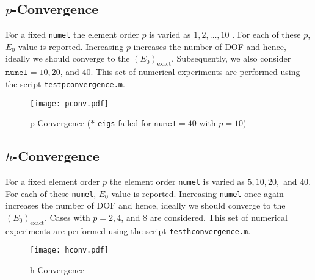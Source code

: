 \documentclass[12pt,dvipsnames]{article}
\begin{document}
\subsection{$p$-Convergence} 
For a fixed \texttt{numel} the element order $p$ is varied as $1, 2, \ldots, 10$ . For each of these $p$, $E_0$ value is 
reported. Increasing $p$ increases the number of DOF and hence, ideally we should converge to the $(E_0)_{\textrm{exact}}$. 
Subsequently, we also consider $\texttt{numel} = 10, 20$, and $40$. This set of numerical experiments are performed using 
the script \texttt{testpconvergence.m}.
%
\begin{figure}[h!]
	\centering
	\texttt{[image: pconv.pdf]}
	\caption{p-Convergence ($\ast$ \texttt{eigs} failed for $\texttt{numel} = 40$ with $p = 10$)}
\end{figure}
%
\subsection{$h$-Convergence}
For a fixed element order $p$ the element order \texttt{numel} is varied as $5, 10, 20,$ and $40$. 
For each of these \texttt{numel}, $E_0$ value is reported. Increasing \texttt{numel} once again increases the 
number of DOF and hence, ideally we should converge to the $(E_0)_{\textrm{exact}}$. 
Cases with $p = 2, 4$, and $8$ are considered. This set of numerical experiments are performed using  
the script \texttt{testhconvergence.m}.
\begin{figure}[h!]
	\centering
	\texttt{[image: hconv.pdf]}
	\caption{h-Convergence}
\end{figure}
\end{document}
